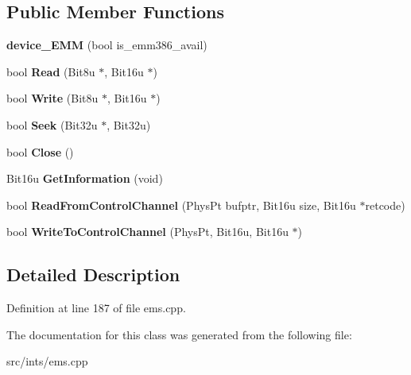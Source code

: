 \subsection*{Public Member Functions}
\begin{DoxyCompactItemize}
\item 
\hypertarget{classdevice__EMM_abe0c07b3c8989251c2c86b710ab83217}{{\bfseries device\-\_\-\-E\-M\-M} (bool is\-\_\-emm386\-\_\-avail)}\label{classdevice__EMM_abe0c07b3c8989251c2c86b710ab83217}

\item 
\hypertarget{classdevice__EMM_a6c62e1a0b8556bf0421d2c4de6eb0e25}{bool {\bfseries Read} (Bit8u $\ast$, Bit16u $\ast$)}\label{classdevice__EMM_a6c62e1a0b8556bf0421d2c4de6eb0e25}

\item 
\hypertarget{classdevice__EMM_adfd5b12355f2d989045fab9fa5e9acc4}{bool {\bfseries Write} (Bit8u $\ast$, Bit16u $\ast$)}\label{classdevice__EMM_adfd5b12355f2d989045fab9fa5e9acc4}

\item 
\hypertarget{classdevice__EMM_adb3ac540c49174fb7fcc58dcd0d8d91e}{bool {\bfseries Seek} (Bit32u $\ast$, Bit32u)}\label{classdevice__EMM_adb3ac540c49174fb7fcc58dcd0d8d91e}

\item 
\hypertarget{classdevice__EMM_a86c23d668635587cda864ce3d6def05d}{bool {\bfseries Close} ()}\label{classdevice__EMM_a86c23d668635587cda864ce3d6def05d}

\item 
\hypertarget{classdevice__EMM_a08750d12358cc26010295c24066caaac}{Bit16u {\bfseries Get\-Information} (void)}\label{classdevice__EMM_a08750d12358cc26010295c24066caaac}

\item 
\hypertarget{classdevice__EMM_ae6da9c47ea49efe899b779f6ccff23d9}{bool {\bfseries Read\-From\-Control\-Channel} (Phys\-Pt bufptr, Bit16u size, Bit16u $\ast$retcode)}\label{classdevice__EMM_ae6da9c47ea49efe899b779f6ccff23d9}

\item 
\hypertarget{classdevice__EMM_a08952bf66d9a65a44dd399dac20e3895}{bool {\bfseries Write\-To\-Control\-Channel} (Phys\-Pt, Bit16u, Bit16u $\ast$)}\label{classdevice__EMM_a08952bf66d9a65a44dd399dac20e3895}

\end{DoxyCompactItemize}


\subsection{Detailed Description}


Definition at line 187 of file ems.\-cpp.



The documentation for this class was generated from the following file\-:\begin{DoxyCompactItemize}
\item 
src/ints/ems.\-cpp\end{DoxyCompactItemize}
